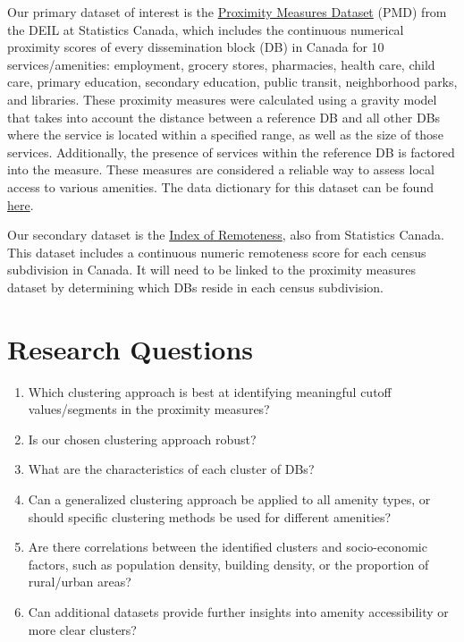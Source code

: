 \documentclass[11pt, a4paper]{article}
\begin{document}
Our primary dataset of interest is the \href{https://www150.statcan.gc.ca/n1/pub/17-26-0002/2020001/csv/pmd-eng.zip}{Proximity Measures Dataset} (PMD) from the DEIL at Statistics Canada, which includes the continuous numerical proximity scores of every dissemination block (DB) in Canada for 10 services/amenities: employment, grocery stores, pharmacies, health care, child care, primary education, secondary education, public transit, neighborhood parks, and libraries. These proximity measures were calculated using a gravity model that takes into account the distance between a reference DB and all other DBs where the service is located within a specified range, as well as the size of those services. Additionally, the presence of services within the reference DB is factored into the measure. These measures are considered a reliable way to assess local access to various amenities. The data dictionary for this dataset can be found \href{https://www150.statcan.gc.ca/n1/pub/71-607-x/71-607-x2020011-eng.htm}{here}.
\par
Our secondary dataset is the \href{https://www150.statcan.gc.ca/n1/pub/17-26-0001/172600012020001-eng.htm}{Index of Remoteness}, also from Statistics Canada. This dataset includes a continuous numeric remoteness score for each census subdivision in Canada. It will need to be linked to the proximity measures dataset by determining which DBs reside in each census subdivision.






\section*{Research Questions}

\begin{enumerate}
\item Which clustering approach is best at identifying meaningful cutoff values/segments in the proximity measures?
\item Is our chosen clustering approach robust?
\item What are the characteristics of each cluster of DBs?
\item Can a generalized clustering approach be applied to all amenity types, or should specific clustering methods be used for different amenities?
\item Are there correlations between the identified clusters and socio-economic factors, such as population density, building density, or the proportion of rural/urban areas?
\item Can additional datasets provide further insights into amenity accessibility or more clear clusters?
\end{enumerate}
\end{document}
